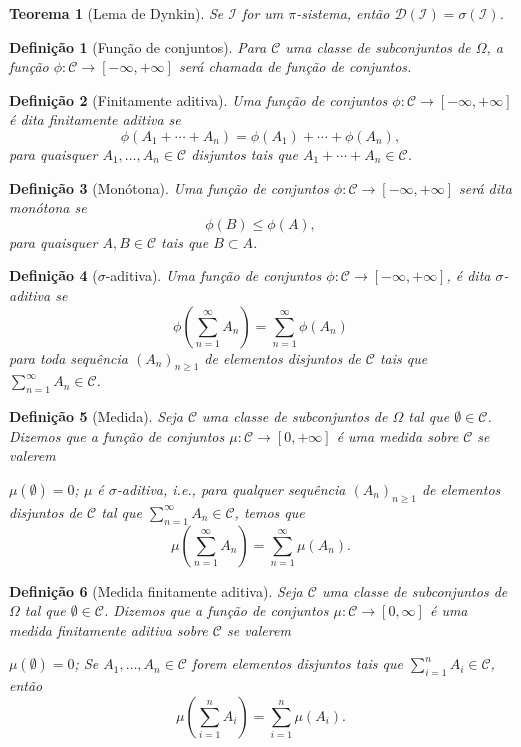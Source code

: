\documentclass[12pt,a4paper,answers]{article}
\numberwithin{equation}{section} %
\newcommand{\Ccal}{\mathcal{C}}
\newcommand{\Dcal}{\mathcal{D}}
\newcommand{\Ical}{\mathcal{I}}
\theoremstyle{thm_estilo}
\newtheorem{theorem}{Teorema}[section]
\newtheorem{definition}{Definição}[section]
\theoremstyle{thm_note_est}
\begin{document}
\begin{theorem}[Lema de Dynkin]
	Se $\Ical$ for um $\pi$-sistema, então $\Dcal(\Ical) = \sigma(\Ical)$.
\end{theorem}

\begin{definition}[Função de conjuntos]
	Para $\Ccal$ uma classe de subconjuntos de $\Omega$, a função $\phi : \Ccal \to [-\infty, +\infty]$ será chamada de função de conjuntos.
\end{definition}

\begin{definition}[Finitamente aditiva]
	Uma função de conjuntos $\phi : \Ccal \to [-\infty, +\infty]$ é dita finitamente aditiva se
	\[
	\phi(A_1 + \cdots + A_n) = \phi(A_1) + \cdots + \phi(A_n),
	\]
	para quaisquer $A_1, \ldots, A_n \in \Ccal$ disjuntos tais que $A_1 + \cdots + A_n \in \Ccal$.
\end{definition}

\begin{definition}[Monótona]
	Uma função de conjuntos $\phi : \Ccal \to [-\infty, +\infty]$ será dita monótona se
	\[
	\phi(B) \leq \phi(A),
	\]
	para quaisquer $A, B \in \Ccal$ tais que $B \subset A$.
\end{definition}

\begin{definition}[$\sigma$-aditiva]
	Uma função de conjuntos $\phi : \Ccal \to [-\infty, +\infty]$, é dita $\sigma$-aditiva se
	\[
	\phi\left( \sum_{n=1}^{\infty} A_n \right) = \sum_{n=1}^{\infty} \phi(A_n)
	\]
	para toda sequência $(A_n)_{n\geq 1}$ de elementos disjuntos de $\Ccal$ tais que $\sum_{n=1}^{\infty} A_n \in \Ccal$.
\end{definition}

\begin{definition}[Medida]
	Seja $\Ccal$ uma classe de subconjuntos de $\Omega$ tal que $\emptyset \in \Ccal$. Dizemos que a função de conjuntos $\mu : \Ccal \to [0, +\infty]$ é uma medida sobre $\Ccal$ se valerem
	\begin{outline}[enumerate]
		\1 $\mu(\emptyset) = 0$;
		\1 $\mu$ é $\sigma$-aditiva, i.e., para qualquer sequência $(A_n)_{n\geq 1}$ de elementos disjuntos de $\Ccal$ tal que $\sum_{n=1}^{\infty} A_n \in \Ccal$, temos que
		\[
		\mu\left( \sum_{n=1}^{\infty} A_n \right) = \sum_{n=1}^{\infty} \mu(A_n).
		\]
	\end{outline}
\end{definition}

\begin{definition}[Medida finitamente aditiva]
	Seja $\Ccal$ uma classe de subconjuntos de $\Omega$ tal que $\emptyset \in \Ccal$. Dizemos que a função de conjuntos $\mu : \Ccal \to [0,\infty]$ é uma medida finitamente aditiva sobre $\Ccal$ se valerem
	\begin{outline}[enumerate]
		\1 $\mu(\emptyset) = 0$;
		\1 Se $A_1, \ldots, A_n \in \Ccal$ forem elementos disjuntos tais que $\sum_{i=1}^{n} A_i \in \Ccal$, então
		\[
		\mu\left( \sum_{i=1}^{n} A_i \right) = \sum_{i=1}^{n} \mu(A_i).
		\]
	\end{outline}
\end{definition}
\end{document}
